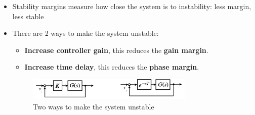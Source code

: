 \documentclass[12pt,a4paper]{article}
\begin{document}
\begin{itemize}
\item Stability margins measure how close the system is to instability: less margin, less stable
\item There are 2 ways to make the system unstable:
\begin{itemize}
 \item \textbf{Increase controller gain}, this reduces the \textbf{gain margin}.
 \item \textbf{Increase time delay}, this reduces the \textbf{phase margin}.
\end{itemize}
\begin{figure}[H] \centering
\includegraphics[width=0.75\textwidth]{images/unstable.png}
\caption{Two ways to make the system unstable}
\end{figure}


\end{itemize}
\end{document}
